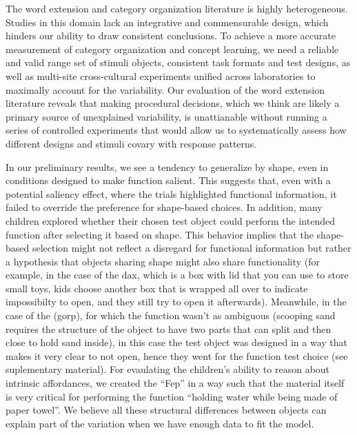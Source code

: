 \documentclass[10pt, letterpaper]{article}
\begin{document}
The word extension and category organization literature is highly
heterogeneous. Studies in this domain lack an integrative and
commensurable design, which hinders our ability to draw consistent
conclusions. To achieve a more accurate measurement of category
organization and concept learning, we need a reliable and valid range
set of stimuli objects, consistent task formats and test designs, as
well as multi-site cross-cultural experiments unified across
laboratories to maximally account for the variability. Our evaluation of
the word extension literature reveals that making procedural decisions,
which we think are likely a primary source of unexplained variability,
is unattianable without running a series of controlled experiments that
would allow us to systematically assess how different designs and
stimuli covary with response patterns.

In our preliminary results, we see a tendency to generalize by shape,
even in conditions designed to make function salient. This suggests
that, even with a potential saliency effect, where the trials
highlighted functional information, it failed to override the preference
for shape-based choices. In addition, many children explored whether
their chosen test object could perform the intended function after
selecting it based on shape. This behavior implies that the shape-based
selection might not reflect a disregard for functional information but
rather a hypothesis that objects sharing shape might also share
functionality (for example, in the case of the dax, which is a box with
lid that you can use to store small toys, kids choose another box that
is wrapped all over to indicate impossibilty to open, and they still try
to open it afterwards). Meanwhile, in the case of the (gorp), for which
the function wasn't as ambiguous (scooping sand requires the structure
of the object to have two parts that can split and then close to hold
sand inside), in this case the test object was designed in a way that
makes it very clear to not open, hence they went for the function test
choice (see suplementary material). For evaulating the children's
ability to reason about intrinsic affordances, we created the ``Fep'' in
a way such that the material itself is very critical for performing the
function ``holding water while being made of paper towel''. We believe
all these structural differences between objects can explain part of the
variation when we have enough data to fit the model.
\end{document}
